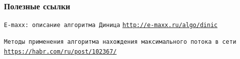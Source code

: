 \documentclass[10pt]{beamer}
\begin{document}
\appendix

\begin{frame}[allowframebreaks]
  \frametitle<presentation>{Полезные ссылки}
    
  \begin{thebibliography}{10}
{
  \beamertemplatebookbibitems

  \texttt{E-maxx: описание алгоритма Диница}
  \newblock \href{http://e-maxx.ru/algo/dinic }{\texttt{http://e-maxx.ru/algo/dinic}}
  
  \texttt{Методы применения алгоритма нахождения максимального потока в сети}
  \newblock \href{https://habr.com/ru/post/102367/ }{\texttt{https://habr.com/ru/post/102367/}}
  
}
  \end{thebibliography}
  \end{frame}
\end{document}
